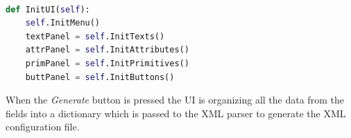 \begin{lstlisting}[language=Python,caption={The method in the GUI that initializes all the components used},label={lst:guicode}]

def InitUI(self):
    self.InitMenu()
    textPanel = self.InitTexts()
    attrPanel = self.InitAttributes()
    primPanel = self.InitPrimitives()
    buttPanel = self.InitButtons()
\end{lstlisting}

When the \textit{Generate} button is pressed the UI is organizing all the data from the fields into a dictionary which is passed to the XML parser to generate the XML configuration file.
